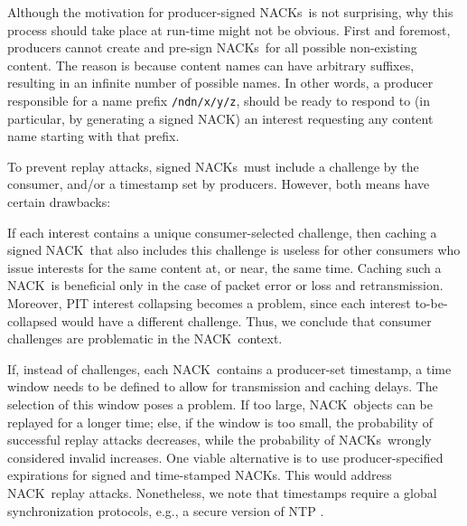 \documentclass[conference]{IEEEtran}
\newcommand{\ndnname}[1]{{\footnotesize\texttt{#1}}}
\newcommand{\cnack}{\mbox{\sf {\cal c}NACK}}
\newcommand{\cnacks}{\mbox{\sf {\cal c}NACK}s}
\begin{document}
Although the motivation for producer-signed \cnacks\ is not surprising, why this process 
should take place at run-time might not be obvious. First and foremost, producers cannot 
create and pre-sign \cnacks\ for all possible non-existing content. The reason is because 
content names can have arbitrary suffixes, resulting in an infinite number of possible names. 
In other words, a producer responsible for a name prefix \ndnname{/ndn/x/y/z}, should be ready
to respond to (in particular, by generating a signed NACK) an interest  requesting any content 
name starting with that prefix.

To prevent replay attacks, signed \cnacks\ must include a challenge by the consumer, and/or 
a timestamp set by producers. However, both means have certain drawbacks:
\begin{compactitem}
\item If each interest contains a unique consumer-selected challenge, then caching a signed \cnack\
that also includes this challenge is useless for other consumers who issue interests for the same content
at, or near, the same time.  Caching such a \cnack\ is beneficial only in the case of packet error or loss and 
retransmission. Moreover, PIT interest collapsing becomes a problem, since each interest to-be-collapsed
would have a different challenge. Thus, we conclude
that consumer challenges are problematic in the \cnack\ context. 
\item If, instead of challenges, each \cnack\ contains a producer-set timestamp, a time window 
needs to be defined to allow for transmission and caching delays. The selection of this window poses a 
problem. If too large, \cnack\ objects can be replayed for a longer time; else, if the 
window is too small, the probability of successful replay attacks decreases, while the probability of 
\cnacks\ wrongly considered invalid increases. 
One viable alternative is to use producer-specified expirations for signed and time-stamped \cnacks.
This would address \cnack\ replay attacks. Nonetheless, we note that timestamps require a global 
synchronization protocols, e.g., a secure version of NTP \cite{mills2010rfc}.
\end{compactitem}
\end{document}
